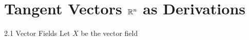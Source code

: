 \section{Tangent Vectors $\mathbb{R}^n$ as Derivations}

\begin{problem}{2.1 Vector Fields}
    Let $X$ be the vector field
\end{problem}